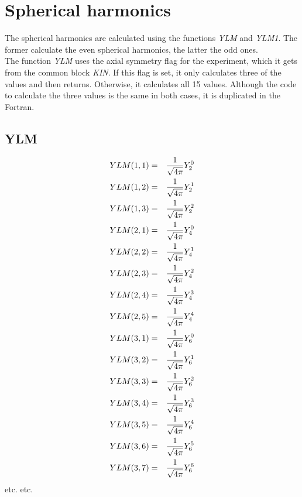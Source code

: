 \chapter{Spherical harmonics}
\label{chapt:spherical}

The spherical harmonics are calculated using the functions \emph{YLM} and
\emph{YLM1}. The former calculate the even spherical harmonics, the latter
the odd ones.\\

The function \emph{YLM} uses the axial symmetry flag for the experiment,
which it gets from the common block \emph{KIN}. If this flag is set, it
only calculates three of the values and then returns. Otherwise, it
calculates all 15 values. Although the code to calculate the three values is
the same in both cases, it is duplicated in the Fortran.\\

\section{YLM}
\begin{eqnarray}
YLM(1,1)&=&{1 \over \sqrt{4 \pi}} Y_2^0\nonumber\\
YLM(1,2)&=&{1 \over \sqrt{4 \pi}} Y_2^1\nonumber\\
YLM(1,3)&=&{1 \over \sqrt{4 \pi}} Y_2^2\nonumber\\
YLM(2,1)&=&{1 \over \sqrt{4 \pi}} Y_4^0\nonumber\\
YLM(2,2)&=&{1 \over \sqrt{4 \pi}} Y_4^1\nonumber\\
YLM(2,3)&=&{1 \over \sqrt{4 \pi}} Y_4^2\nonumber\\
YLM(2,4)&=&{1 \over \sqrt{4 \pi}} Y_4^3\nonumber\\
YLM(2,5)&=&{1 \over \sqrt{4 \pi}} Y_4^4\nonumber\\
YLM(3,1)&=&{1 \over \sqrt{4 \pi}} Y_6^0\nonumber\\
YLM(3,2)&=&{1 \over \sqrt{4 \pi}} Y_6^1\nonumber\\
YLM(3,3)&=&{1 \over \sqrt{4 \pi}} Y_6^2\nonumber\\
YLM(3,4)&=&{1 \over \sqrt{4 \pi}} Y_6^3\nonumber\\
YLM(3,5)&=&{1 \over \sqrt{4 \pi}} Y_6^4\nonumber\\
YLM(3,6)&=&{1 \over \sqrt{4 \pi}} Y_6^5\nonumber\\
YLM(3,7)&=&{1 \over \sqrt{4 \pi}} Y_6^6\nonumber\\
\end{eqnarray}
etc. etc.\\

